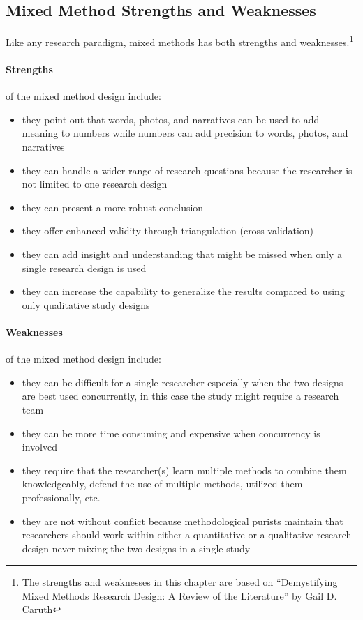 \subsection{Mixed Method Strengths and Weaknesses}

Like any research paradigm, mixed methods has both strengths and weaknesses.\footnote{The strengths and weaknesses in this chapter are based on ``Demystifying Mixed Methods Research Design: A Review of the Literature'' by Gail D. Caruth\cite{caruth2013demystifying}}

\paragraph{Strengths} of the mixed method design include: 

\begin{itemize}
	\item they point out that words, photos, and narratives can be used to add meaning to numbers while numbers can add precision to words, photos, and narratives
	\item they can handle a wider range of research questions because the researcher is not limited to one research design
	\item they can present a more robust conclusion
	\item they offer enhanced validity through triangulation (cross validation)
	\item they can add insight and understanding that might be missed when only a single research design is used
	\item they can increase the capability to generalize the results compared to using only qualitative study designs
\end{itemize}

\paragraph{Weaknesses} of the mixed method design include: 

\begin{itemize}
	\item they can be difficult for a single researcher especially when the two designs are best used concurrently, in this case the study might require a research team
	\item they can be more time consuming and expensive when concurrency is involved
	\item they require that the researcher(s) learn multiple methods to combine them knowledgeably, defend the use of multiple methods, utilized them professionally, etc.
	\item they are not without conflict because methodological purists maintain that researchers should work within either a quantitative or a qualitative research design never mixing the two designs in a single study
\end{itemize}

